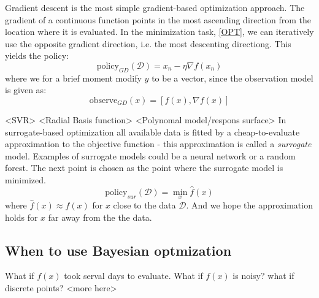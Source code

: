 \begin{testexample}
    Gradient descent is the most simple gradient-based optimization approach. The gradient of a continuous 
    function points in the most ascending direction from the location where it is evaluated.
    In the minimization task, \eqref{OPT}, we can iteratively use the opposite gradient direction, i.e. the most 
    descenting directiong. This yields the policy:
    $$\text{policy}_{GD}(\mathcal{D}) = x_n - \eta \nabla f(x_n)$$
    where we for a brief moment modify $y$ to be a vector, since the observation model 
    is given as:
    $$\text{observe}_{GD}(x) = [f(x), \nabla f(x)]$$
\end{testexample}

\begin{testexample}
    <SVR> <Radial Basis function> <Polynomal model/respons surface>
    In surrogate-based optimization all available data is fitted by a cheap-to-evaluate approximation
    to the objective function - this approximation is called a \textit{surrogate} model. Examples
    of surrogate models could be a neural network or a random forest. The next point is 
    chosen as the point where the surrogate model is minimized. 
    $$\text{policy}_{sur}(\mathcal{D}) = \min_x \hat f(x)$$
    where $\hat f(x) \approx f(x)$ for $x$ close to the data $\mathcal{D}$. And we hope the approximation
    holds for $x$ far away from the the data. \textbf{}
\end{testexample}

\subsection{When to use Bayesian optmization}
What if $f(x)$ took serval days to evaluate. What if $f(x)$ is noisy? what if discrete points? 
<more here>

